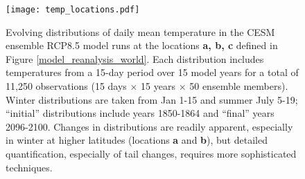 \documentclass{ametsoc}
\newcommand\smallfigwidth{\columnwidth}
\begin{document}



\begin{figure}[ht]
\centerline{\texttt{[image: temp\_locations.pdf]}}
\caption{\small{Evolving distributions of daily mean temperature in the CESM ensemble RCP8.5 model runs at the locations \textbf{a, b, c} defined in Figure \ref{model_reanalysis_world}.  Each distribution includes temperatures from a 15-day period over 15 model years for a total of 11,250 observations (15 days $\times$ 15 years $\times$ 50 ensemble members). Winter distributions %
are taken from Jan 1-15 and summer July 5-19;  ``initial'' distributions include years 1850-1864 and ``final'' years 2096-2100. Changes in distributions are readily apparent, especially in winter at higher latitudes (locations \textbf{a} and \textbf{b}), but detailed quantification, especially of tail changes, requires more sophisticated techniques.}}
\label{location_distributions}
\end{figure}
\end{document}
